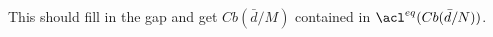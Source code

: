 This should fill in the gap and get %
$Cb(\bar d/M)$ contained in $\acl^{eq}(Cb(\bar d/N))$.


% 
%
%
